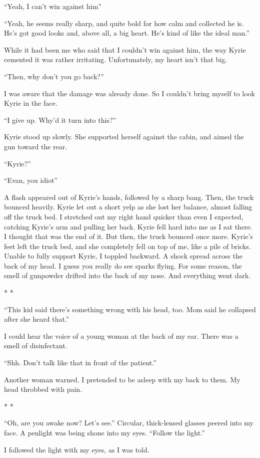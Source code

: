 \documentclass[oneside]{book}
\begin{document}
“Yeah, I can’t win against him”

“Yeah, he seems really sharp, and quite bold for how calm and collected he is. He’s got good looks and, above all, a big heart. He’s kind of like the ideal man.”

While it had been me who said that I couldn’t win against him, the way Kyrie cemented it was rather irritating. Unfortunately, my heart isn’t that big.

“Then, why don’t you go back?”

I was aware that the damage was already done. So I couldn’t bring myself to look Kyrie in the face.

“I give up. Why’d it turn into this?”

Kyrie stood up slowly. She supported herself against the cabin, and aimed the gun toward the rear.

“Kyrie?”

“Evan, you idiot”

A flash appeared out of Kyrie’s hands, followed by a sharp bang. Then, the truck bounced heavily. Kyrie let out a short yelp as she lost her balance, almost falling off the truck bed. I stretched out my right hand quicker than even I expected, catching Kyrie’s arm and pulling her back. Kyrie fell hard into me as I sat there. I thought that was the end of it. But then, the truck bounced once more. Kyrie’s feet left the truck bed, and she completely fell on top of me, like a pile of bricks. Unable to fully support Kyrie, I toppled backward. A shock spread across the back of my head. I guess you really do see sparks flying. For some reason, the smell of gunpowder drifted into the back of my nose. And everything went dark.

* *

“This kid said there’s something wrong with his head, too. Mom said he collapsed after she heard that.”

I could hear the voice of a young woman at the back of my ear. There was a smell of disinfectant.

“Shh. Don’t talk like that in front of the patient.”

Another woman warned. I pretended to be asleep with my back to them. My head throbbed with pain.

* *

“Oh, are you awake now? Let’s see.” Circular, thick-lensed glasses peered into my face. A penlight was being shone into my eyes. “Follow the light.”

I followed the light with my eyes, as I was told.
\end{document}
